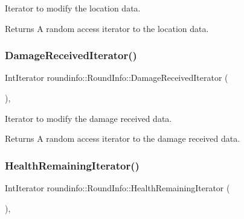 Iterator to modify the location data. 

\begin{DoxyReturn}{Returns}
A random access iterator to the location data. 
\end{DoxyReturn}
\mbox{\label{classroundinfo_1_1_round_info_a94ea1a09ae7680e74188296aef0b0d63}} 
\subsubsection{\texorpdfstring{Damage\+Received\+Iterator()}{DamageReceivedIterator()}}
{\footnotesize\ttfamily Int\+Iterator roundinfo\+::\+Round\+Info\+::\+Damage\+Received\+Iterator (\begin{DoxyParamCaption}{ }\end{DoxyParamCaption})\hspace{0.3cm}{\ttfamily [inline]}, {\ttfamily [noexcept]}}



Iterator to modify the damage received data. 

\begin{DoxyReturn}{Returns}
A random access iterator to the damage received data. 
\end{DoxyReturn}
\mbox{\label{classroundinfo_1_1_round_info_a3a81f2d87bea27339f035201f1887423}} 
\subsubsection{\texorpdfstring{Health\+Remaining\+Iterator()}{HealthRemainingIterator()}}
{\footnotesize\ttfamily Int\+Iterator roundinfo\+::\+Round\+Info\+::\+Health\+Remaining\+Iterator (\begin{DoxyParamCaption}{ }\end{DoxyParamCaption})\hspace{0.3cm}{\ttfamily [inline]}, {\ttfamily [noexcept]}}



